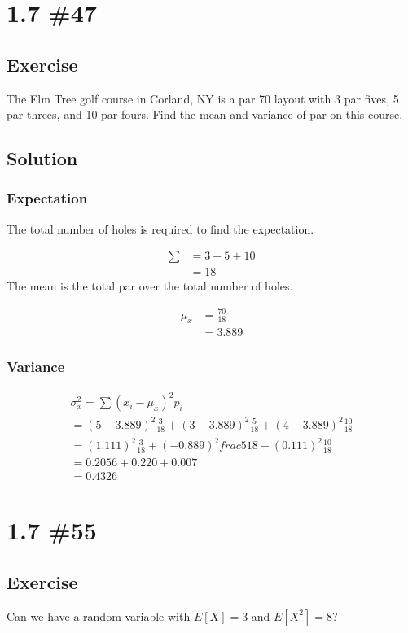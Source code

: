 \documentclass[12pt]{article}
\begin{document}
\section{1.7 \#47} 
\subsection{Exercise}
The Elm Tree golf course in Corland, NY is a par 70 layout with 3 par fives, 5 par threes, and 10 par fours. Find 
the mean and variance of par on this course.

\subsection{Solution}
\subsubsection{Expectation}
The total number of holes is required to find the expectation.

\begin{align*}
\sum &= 3 + 5 + 10\\
&= 18
\end{align*}
The mean is the total par over the total number of holes.

\begin{align*}
\mu_x &= \frac{70}{18}\\
&= 3.889\end{align*}

\subsubsection{Variance}
\begin{align*}
\sigma_x^2 = \sum(x_i-\mu_x)^2p_i\\
 = (5-3.889)^2\frac{3}{18}+(3-3.889)^2\frac{5}{18}+(4-3.889)^2\frac{10}{18}\\
 = (1.111)^2\frac{3}{18}+(-0.889)^2frac{5}{18}+(0.111)^2\frac{10}{18}\\
 = 0.2056+0.220+0.007\\
 = 0.4326
\end{align*}

\section{1.7 \#55} 
\subsection{Exercise}
Can we have a random variable with $E[X]=3$ and $E[X^2] = 8$?
\end{document}
